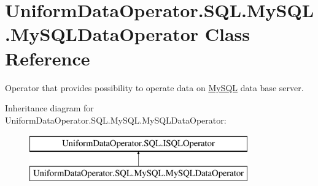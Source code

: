 \hypertarget{class_uniform_data_operator_1_1_s_q_l_1_1_my_s_q_l_1_1_my_s_q_l_data_operator}{}\section{Uniform\+Data\+Operator.\+S\+Q\+L.\+My\+S\+Q\+L.\+My\+S\+Q\+L\+Data\+Operator Class Reference}
\label{class_uniform_data_operator_1_1_s_q_l_1_1_my_s_q_l_1_1_my_s_q_l_data_operator}


Operator that provides possibility to operate data on \mbox{\hyperlink{namespace_uniform_data_operator_1_1_s_q_l_1_1_my_s_q_l}{My\+S\+QL}} data base server.  


Inheritance diagram for Uniform\+Data\+Operator.\+S\+Q\+L.\+My\+S\+Q\+L.\+My\+S\+Q\+L\+Data\+Operator\+:\begin{figure}[H]
\begin{center}
\leavevmode
\includegraphics[height=2.000000cm]{d9/d5d/class_uniform_data_operator_1_1_s_q_l_1_1_my_s_q_l_1_1_my_s_q_l_data_operator}
\end{center}
\end{figure}

